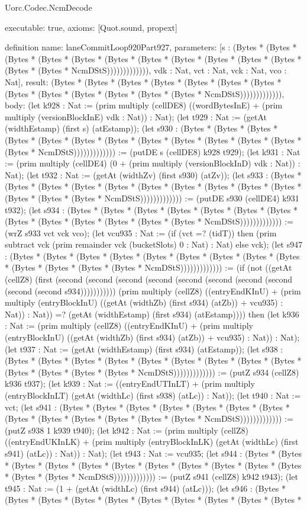 \begin{lexlean}{Uorc.Codec.NcmDecode}
\begin{semanticmodule}
{  executable: true,
  axioms: [Quot.sound, propext]
}

definition{
  name: laneCommitLoop920Part927,
  parameters: [s : (Bytes * (Bytes * (Bytes * (Bytes * (Bytes * (Bytes * (Bytes * (Bytes * (Bytes * (Bytes * (Bytes * (Bytes * (Bytes * NcmDStS))))))))))))), vdk : Nat, vct : Nat, vck : Nat, vco : Nat],
  result: (Bytes * (Bytes * (Bytes * (Bytes * (Bytes * (Bytes * (Bytes * (Bytes * (Bytes * (Bytes * (Bytes * (Bytes * (Bytes * NcmDStS))))))))))))),
  body: (let k928 : Nat := (prim multiply (cellDE8) ((wordBytesInE) + (prim multiply (versionBlockInE) vdk : Nat)) : Nat); (let t929 : Nat := (getAt (widthEstamp) (first s) (atEstamp)); (let s930 : (Bytes * (Bytes * (Bytes * (Bytes * (Bytes * (Bytes * (Bytes * (Bytes * (Bytes * (Bytes * (Bytes * (Bytes * (Bytes * NcmDStS))))))))))))) := (putDE s (cellDE8) k928 t929); (let k931 : Nat := (prim multiply (cellDE4) (0 + (prim multiply (versionBlockInD) vdk : Nat)) : Nat); (let t932 : Nat := (getAt (widthZv) (first s930) (atZv)); (let s933 : (Bytes * (Bytes * (Bytes * (Bytes * (Bytes * (Bytes * (Bytes * (Bytes * (Bytes * (Bytes * (Bytes * (Bytes * (Bytes * NcmDStS))))))))))))) := (putDE s930 (cellDE4) k931 t932); (let s934 : (Bytes * (Bytes * (Bytes * (Bytes * (Bytes * (Bytes * (Bytes * (Bytes * (Bytes * (Bytes * (Bytes * (Bytes * (Bytes * NcmDStS))))))))))))) := (wrZ s933 vct vck vco); (let vcu935 : Nat := (if (vct =? (tidT)) then (prim subtract vck (prim remainder vck (bucketSlots) 0 : Nat) : Nat) else vck); (let s947 : (Bytes * (Bytes * (Bytes * (Bytes * (Bytes * (Bytes * (Bytes * (Bytes * (Bytes * (Bytes * (Bytes * (Bytes * (Bytes * NcmDStS))))))))))))) := (if (not ((getAt (cellZ8) (first (second (second (second (second (second (second (second (second (second (second s934))))))))))) (prim multiply (cellZ8) ((entryEndKInU) + (prim multiply (entryBlockInU) ((getAt (widthZb) (first s934) (atZb)) + vcu935) : Nat)) : Nat)) =? (getAt (widthEstamp) (first s934) (atEstamp)))) then (let k936 : Nat := (prim multiply (cellZ8) ((entryEndKInU) + (prim multiply (entryBlockInU) ((getAt (widthZb) (first s934) (atZb)) + vcu935) : Nat)) : Nat); (let t937 : Nat := (getAt (widthEstamp) (first s934) (atEstamp)); (let s938 : (Bytes * (Bytes * (Bytes * (Bytes * (Bytes * (Bytes * (Bytes * (Bytes * (Bytes * (Bytes * (Bytes * (Bytes * (Bytes * NcmDStS))))))))))))) := (putZ s934 (cellZ8) k936 t937); (let k939 : Nat := ((entryEndUTInLT) + (prim multiply (entryBlockInLT) (getAt (widthLc) (first s938) (atLc)) : Nat)); (let t940 : Nat := vct; (let s941 : (Bytes * (Bytes * (Bytes * (Bytes * (Bytes * (Bytes * (Bytes * (Bytes * (Bytes * (Bytes * (Bytes * (Bytes * (Bytes * NcmDStS))))))))))))) := (putZ s938 1 k939 t940); (let k942 : Nat := (prim multiply (cellZ8) ((entryEndUKInLK) + (prim multiply (entryBlockInLK) (getAt (widthLc) (first s941) (atLc)) : Nat)) : Nat); (let t943 : Nat := vcu935; (let s944 : (Bytes * (Bytes * (Bytes * (Bytes * (Bytes * (Bytes * (Bytes * (Bytes * (Bytes * (Bytes * (Bytes * (Bytes * (Bytes * NcmDStS))))))))))))) := (putZ s941 (cellZ8) k942 t943); (let t945 : Nat := (1 + (getAt (widthLc) (first s944) (atLc))); (let s946 : (Bytes * (Bytes * (Bytes * (Bytes * (Bytes * (Bytes * (Bytes * (Bytes * (Bytes * (Bytes * }
\end{semanticmodule}
\end{lexlean}
